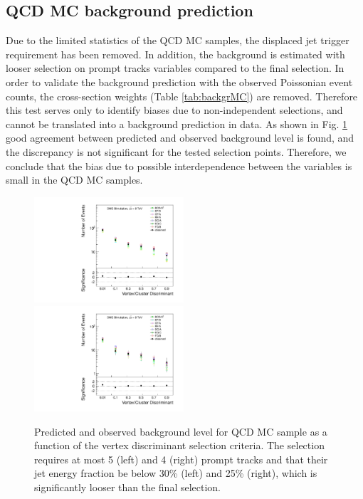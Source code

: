 \subsection{QCD MC background prediction}
\label{subsec:bkgQCDMC}

Due to the limited statistics of the QCD MC samples, the displaced jet trigger requirement has been removed. In addition, the background is estimated with looser
 selection on prompt tracks variables compared to the final selection. 
In order to validate the background prediction with 
the observed Poissonian event counts, the cross-section weights (Table \ref{tab:backgrMC}) 
are removed. 
Therefore this test serves only to identify biases due to non-independent selections,
and cannot be translated
into a background prediction in data.  
As shown in Fig. \ref{fig:bkg_MC} good agreement between predicted and observed background level is found, 
and the discrepancy is not significant for the tested selection points. Therefore, we conclude that the  
bias due to possible interdependence between the variables is small in the QCD MC samples. 

\begin{figure}[htbp]
  \centering
  \includegraphics[width=0.495\textwidth]{plots/background/bkg_MC1.pdf}
  \includegraphics[width=0.495\textwidth]{plots/background/bkg_MC2.pdf}
  \caption{Predicted and observed background level for QCD MC sample as a function of the vertex discriminant selection criteria.
The selection requires at most 5 (left) and 4 (right)  prompt tracks and that their jet energy fraction be below 30\% (left) and 25\% (right), which
is significantly looser than the final selection. \label{fig:bkg_MC}}
  \end{figure}


